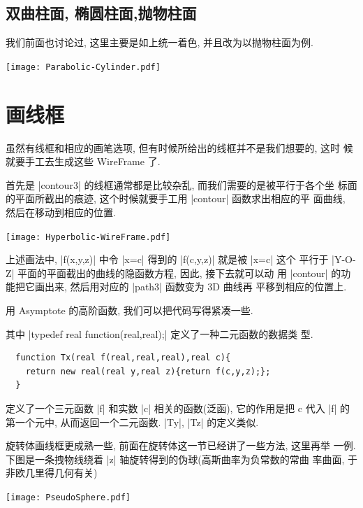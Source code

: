 \documentclass{ctexbook}
\begin{document}
\subsection{双曲柱面, 椭圆柱面,抛物柱面}
我们前面也讨论过, 这里主要是如上统一着色, 并且改为以抛物柱面为例.
\begin{center}\texttt{[image: Parabolic-Cylinder.pdf]}\end{center}%


\section{画线框}
虽然有线框和相应的画笔选项, 但有时候所给出的线框并不是我们想要的, 这时
候就要手工去生成这些 WireFrame 了.

首先是 |contour3| 的线框通常都是比较杂乱, 而我们需要的是被平行于各个坐
标面的平面所截出的痕迹, 这个时候就要手工用 |contour| 函数求出相应的平
面曲线, 然后在移动到相应的位置.
\begin{center}\texttt{[image: Hyperbolic-WireFrame.pdf]}\end{center}%

上述画法中, |f(x,y,z)| 中令 |x=c| 得到的 |f(c,y,z)| 就是被 |x=c| 这个
平行于 |Y-O-Z| 平面的平面截出的曲线的隐函数方程, 因此, 接下去就可以动
用 |contour| 的功能把它画出来, 然后用对应的 |path3| 函数变为 3D 曲线再
平移到相应的位置上.

用 Asymptote 的高阶函数, 我们可以把代码写得紧凑一些.

其中 |typedef real function(real,real);| 定义了一种二元函数的数据类
型.
\begin{lstlisting}
  function Tx(real f(real,real,real),real c){
    return new real(real y,real z){return f(c,y,z);};
  }
\end{lstlisting}
定义了一个三元函数 |f| 和实数 |c| 相关的函数(泛函), 它的作用是把 c 代入
|f| 的第一个元中, 从而返回一个二元函数. |Ty|, |Tz| 的定义类似.

旋转体画线框更成熟一些, 前面在旋转体这一节已经讲了一些方法, 这里再举
一例. 下图是一条拽物线绕着 |z| 轴旋转得到的伪球(高斯曲率为负常数的常曲
率曲面, 于非欧几里得几何有关)
\begin{center}\texttt{[image: PseudoSphere.pdf]}\end{center}%

\end{document}
